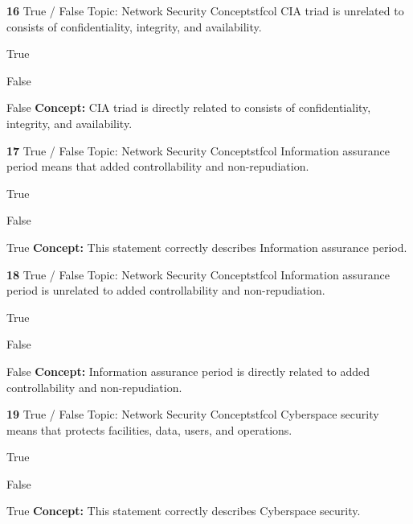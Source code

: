 \documentclass[10pt,a4paper]{article}
\begin{document}
\begin{qcard}{\color{white}\textbf{16} \hfill \small True / False \textbar{} Topic: Network Security Concepts}{tfcol}
CIA triad is unrelated to consists of confidentiality, integrity, and availability.

\begin{qoptions}
\item True
\item False
\end{qoptions}
\begin{explainbox}{False}
\textbf{Concept:} CIA triad is directly related to consists of confidentiality, integrity, and availability.
\end{explainbox}
\end{qcard}

\begin{qcard}{\color{white}\textbf{17} \hfill \small True / False \textbar{} Topic: Network Security Concepts}{tfcol}
Information assurance period means that added controllability and non-repudiation.

\begin{qoptions}
\item True
\item False
\end{qoptions}
\begin{explainbox}{True}
\textbf{Concept:} This statement correctly describes Information assurance period.
\end{explainbox}
\end{qcard}

\begin{qcard}{\color{white}\textbf{18} \hfill \small True / False \textbar{} Topic: Network Security Concepts}{tfcol}
Information assurance period is unrelated to added controllability and non-repudiation.

\begin{qoptions}
\item True
\item False
\end{qoptions}
\begin{explainbox}{False}
\textbf{Concept:} Information assurance period is directly related to added controllability and non-repudiation.
\end{explainbox}
\end{qcard}

\begin{qcard}{\color{white}\textbf{19} \hfill \small True / False \textbar{} Topic: Network Security Concepts}{tfcol}
Cyberspace security means that protects facilities, data, users, and operations.

\begin{qoptions}
\item True
\item False
\end{qoptions}
\begin{explainbox}{True}
\textbf{Concept:} This statement correctly describes Cyberspace security.
\end{explainbox}
\end{qcard}
\end{document}
